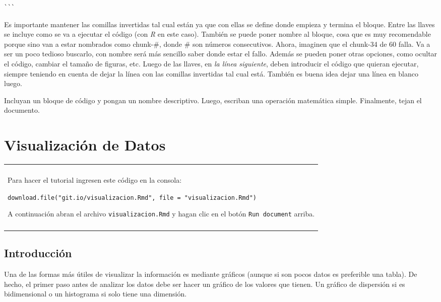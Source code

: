 \documentclass[]{book}
\newenvironment{atencion}
    {\begin{center}
    \begin{tabular}{|p{0.9\textwidth}|}
    \hline\\
    }
    { 
    \\\\\hline
    \end{tabular} 
    \end{center}
    }
\theoremstyle{definition}
\theoremstyle{definition}
\theoremstyle{definition}
\theoremstyle{remark}
\let\BeginKnitrBlock\begin \let\EndKnitrBlock\end
\begin{document}
\begin{verbatim}
```
\end{verbatim}

Es importante mantener las comillas invertidas tal cual están ya que con
ellas se define donde empieza y termina el bloque. Entre las llaves se
incluye como se va a ejecutar el código (con \emph{R} en este caso).
También se puede poner nombre al bloque, cosa que es muy recomendable
porque sino van a estar nombrados como chunk-\#, donde \# son números
consecutivos. Ahora, imaginen que el chunk-34 de 60 falla. Va a ser un
poco tedioso buscarlo, con nombre será más sencillo saber donde estar el
fallo. Además se pueden poner otras opciones, como ocultar el código,
cambiar el tamaño de figuras, etc. Luego de las llaves, en \emph{la
línea siguiente}, deben introducir el código que quieran ejecutar,
siempre teniendo en cuenta de dejar la línea con las comillas invertidas
tal cual está. También es buena idea dejar una línea en blanco luego.

\BeginKnitrBlock{exercise}
\protect\hypertarget{exr:ejercicio-3}{}{\label{exr:ejercicio-3} }Incluyan un
bloque de código y pongan un nombre descriptivo. Luego, escriban una
operación matemática simple. Finalmente, tejan el documento.
\EndKnitrBlock{exercise}

\hypertarget{visualizacion-de-datos}{%
\chapter{Visualización de Datos}\label{visualizacion-de-datos}}

\begin{atencion}
Para hacer el tutorial ingresen este código en la consola:

\texttt{download.file("git.io/visualizacion.Rmd",\ file\ =\ "visualizacion.Rmd")}

A continuación abran el archivo \texttt{visualizacion.Rmd} y hagan clic
en el botón \texttt{Run\ document} arriba.
\end{atencion}

\hypertarget{introduccion}{%
\section{Introducción}\label{introduccion}}

Una de las formas más útiles de visualizar la información es mediante
gráficos (aunque si son pocos datos es preferible una tabla). De hecho,
el primer paso antes de analizar los datos debe ser hacer un gráfico de
los valores que tienen. Un gráfico de dispersión si es bidimensional o
un histograma si solo tiene una dimensión.
\end{document}
